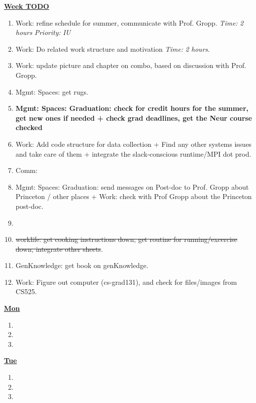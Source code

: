\documentclass[serif,mathserif,final]{beamer}
\newcommand{\doneTask}[1]{\item \sout{#1}}
\newcommand{\timeEst}[1]{\textit{Time:} \textit{#1}}
\newcommand{\priority}[1]{\textit{Priority:} \textit{#1}}
\begin{document}
\begin{frame}{}
\begin{columns}[t]
\begin{column}{0.33\linewidth}{\textbf{\underline{Week TODO}}}
\begin{block}
\begin{enumerate}
\item \tiny Work: refine schedule for summer, communicate with Prof. Gropp. \timeEst{2 hours} \priority{IU} 
\item \tiny Work: Do related work structure and motivation \timeEst{2 hours}. 
\item \tiny Work: update picture and chapter on combo, based on discussion with Prof. Gropp. 
\item \tiny Mgmt: Spaces: get rugs. 

\item \tiny \textbf{Mgmt: Spaces: Graduation: check for credit hours for the summer, get new ones if needed + check grad deadlines, get the Neur course checked} 

\item \tiny Work: Add code structure for data collection + Find any other systems issues and take care of them + integrate the
  slack-conscious runtime/MPI dot prod.  

\item \tiny Comm: 

\item \tiny Mgmt: Spaces: Graduation: send messages on Post-doc to Prof. Gropp about Princeton / other places + 
  Work: check with Prof Gropp about the Princeton post-doc. 

\item \tiny \doneTask{worklife: get cooking instructions down, get
  routine for running/excercise down, integrate other sheets}. 

\item \tiny GenKnowledge: get book on genKnowledge. 
\item \tiny Work: Figure out computer (cs-grad131), and check for files/images from CS525. 
\end{enumerate}
\end{block} 

\begin{block} 

\textbf{\underline{Mon}}
\begin{enumerate} 
\tiny \item \tiny 
\item \tiny 
\item \tiny 
\end{enumerate} 


\textbf{\underline{Tue}}
\begin{enumerate} 
\tiny \item \tiny 
\item \tiny 
\item \tiny 
\end{enumerate} 



\end{block}
\end{column}
\end{columns}
\end{frame}
\end{document}
